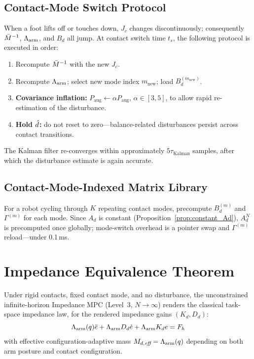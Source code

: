 \subsection{Contact-Mode Switch Protocol}

When a foot lifts off or touches down, $J_c$ changes discontinuously;
consequently $\bar{M}^{-1}$, $\Lambda_{\text{arm}}$, and $B_d$ all jump.
At contact switch time $t_s$, the following protocol is executed in order:
\begin{enumerate}
  \item Recompute $\bar{M}^{-1}$ with the new $J_c$.
  \item Recompute $\Lambda_{\text{arm}}$; select new mode index $m_{\text{new}}$; load $B_d^{(m_{\text{new}})}$.
  \item \textbf{Covariance inflation:} $P_{\text{aug}}\leftarrow\alpha P_{\text{aug}}$,
        $\alpha\in[3,5]$, to allow rapid re-estimation of the disturbance.
  \item \textbf{Hold $\hat{d}$:} do not reset to zero---balance-related
        disturbances persist across contact transitions.
\end{enumerate}
The Kalman filter re-converges within approximately $5\tau_{\text{Kalman}}$
samples, after which the disturbance estimate is again accurate.

\subsection{Contact-Mode-Indexed Matrix Library}

For a robot cycling through $K$ repeating contact modes, precompute
$B_d^{(m)}$ and $\Gamma^{(m)}$ for each mode.
Since $A_d$ is constant (Proposition~\ref{prop:constant_Ad}), $A_d^N$ is
precomputed once globally; mode-switch overhead is a pointer swap and
$\Gamma^{(m)}$ reload---under 0.1\,ms.

\section{Impedance Equivalence Theorem}\label{sec:theorem}

\begin{theorem}\label{thm:equivalence}
Under rigid contacts, fixed contact mode, and no disturbance, the
unconstrained infinite-horizon Impedance MPC (Level~3, $N\to\infty$)
renders the classical task-space impedance law, for the rendered impedance
gains $(K_d,D_d)$:
\begin{equation}\label{eq:impedance}
  \Lambda_{\text{arm}}(q)\ddot{e}+\Lambda_{\text{arm}} D_d\dot{e}+\Lambda_{\text{arm}} K_d e = F_h
\end{equation}
with effective configuration-adaptive mass $M_{d,\emph{eff}}=\Lambda_{\text{arm}}(q)$
depending on both arm posture and contact configuration.
\end{theorem}

